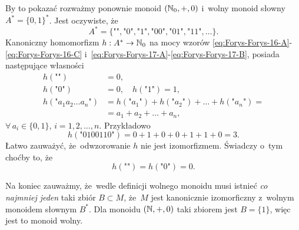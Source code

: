 \documentclass[a4paper,11pt]{article}
\begin{document}
By to pokazać rozważmy ponownie monoid $( \mathbb{N}_{ 0 }, +, 0 )$ i~wolny
monoid słowny $A^{ * } = \{ 0, 1 \}^{ * }$. Jest oczywiste, że
\begin{equation}
  \label{eq:Forys-Forys-18}
  A^{ * } =
  \{ \texttt{""}, \texttt{"} 0 \texttt{"}, \texttt{"} 1 \texttt{"},
  \texttt{"} 0 0 \texttt{"}, \texttt{"} 0 1 \texttt{"},
  \texttt{"} 1 1 \texttt{"}, \ldots \}.
\end{equation}
Kanoniczny homomorfizm $h : A^{ * } \to \mathbb{N}_{ 0 }$ na mocy wzorów
\eqref{eq:Forys-Forys-16-A}-\eqref{eq:Forys-Forys-16-C}
i~\eqref{eq:Forys-Forys-17-A}-\eqref{eq:Forys-Forys-17-B}, posiada
następujące własności
\begin{subequations}
  \begin{align}
    \label{eq:Forys-Forys-19-A}
    h( \texttt{""} ) &= 0, \\
    \label{eq:Forys-Forys-19-B}
    h( \texttt{"} 0 \texttt{"} ) &= 0, \quad
                                   h( \texttt{"} 1 \texttt{"} ) = 1, \\
    \label{eq:Forys-Forys-19-C}
    h( \texttt{"} a_{ 1 } a_{ 2 } \ldots a_{ n } \texttt{"} )
                     &= h( \texttt{"} a_{ 1 } \texttt{"} )
                       + h( \texttt{"} a_{ 2 } \texttt{"} ) + \ldots
                       + h( \texttt{"} a_{ n } \texttt{"} ) = \\
                     &= a_{ 1 } + a_{ 2 } + \ldots + a_{ n },
  \end{align}
\end{subequations}
$\forall \, a_{ i } \in \{ 0, 1 \}$, $i = 1, 2, \ldots, n$.
Przykładowo
\begin{equation}
  \label{eq:Forys-Forys-20}
  h( \texttt{"} 0100110 \texttt{"} ) =
  0 + 1 + 0 + 0 + 1 + 1 + 0 = 3.
\end{equation}
Łatwo zauważyć, że~odwzorowanie $h$ nie jest izomorfizmem. Świadczy
o~tym choćby to, że
\begin{equation}
  \label{eq:Forys-Forys-21}
  h( \texttt{""} ) = h( \texttt{"} 0 \texttt{"} ) = 0.
\end{equation}

Na koniec zauważmy, że~wedle definicji wolnego monoidu musi istnieć
\textit{co najmniej jeden} taki zbiór $B \subset M$, że~$M$ jest
kanonicznie izomorficzny z~wolnym monoidem słownym $B^{ * }$. Dla
monoidu $( \mathbb{N}, +, 0 )$ taki zbiorem jest $B = \{ 1 \}$, więc jest to
monoid wolny.

\vspace{\spaceFour}
\end{document}
